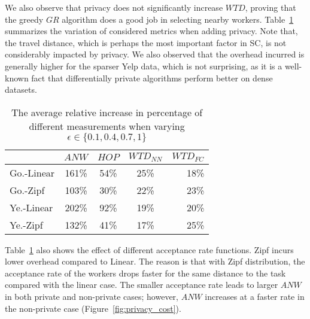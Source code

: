 \documentclass{USC-Thesis}
\newcommand{\tn}{\tabularnewline}
\numberwithin{equation}{chapter}
\begin{document}
We also observe that privacy does not significantly increase $\mathit{WTD}$, proving that the greedy $\mathit{GR}$ algorithm does a good job in selecting nearby workers. 
Table~\ref{tab:privacy_cost} summarizes the variation of considered metrics when adding privacy. Note that, the travel distance, which is perhaps the most important factor in SC, is not considerably impacted by privacy. We also observed that the overhead incurred is generally higher for the sparser Yelp data, which is not surprising, 
as it is a well-known fact that differentially private algorithms perform better on dense datasets.

\begin{table}
\begin{center}
\footnotesize
\begin{tabular}{ l | c | c | c | r}
\hline
\textbf{} & \textbf{$\mathit{ANW}$} & \textbf{$\mathit{HOP}$} & \textbf{$\mathit{WTD_{NN}}$} & \textbf{$\mathit{WTD_{FC}}$} \tn
\hline
Go.-Linear & 161\% & 54\% & 25\% & 18\% \tn
\hline
Go.-Zipf & 103\% & 30\% & 22\% & 23\% \tn
\hline
Ye.-Linear & 202\% & 92\% & 19\%& 20\% \tn
\hline
Ye.-Zipf & 132\% & 41\% & 17\%& 25\% \tn
\hline
\end{tabular}
\caption{The average relative increase in percentage of different measurements when varying $\epsilon \in \{0.1, 0.4,0.7,1\}$}
\label{tab:privacy_cost}
\end{center}
\end{table}

Table~\ref{tab:privacy_cost} also shows the effect of different acceptance rate functions. Zipf incurs lower overhead compared to Linear. The reason is that with Zipf distribution, the acceptance rate of the workers drops faster for the same distance to the task compared with the linear case. The smaller acceptance rate leads to larger $\mathit{ANW}$ in both private and non-private cases; however, $\mathit{ANW}$ increases at a faster rate in the non-private case (Figure~\ref{fig:privacy_cost}).
\end{document}
